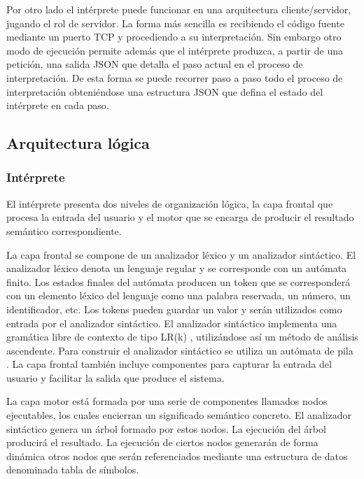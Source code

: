 Por otro lado el intérprete puede funcionar en una arquitectura cliente/servidor, jugando el rol de servidor. La forma más sencilla es recibiendo el código fuente 
mediante un puerto TCP y procediendo a su interpretación. Sin embargo otro modo de ejecución permite además que el intérprete produzca, a partir de una petición, una salida JSON que detalla el paso actual 
en el proceso de interpretación. De esta forma se puede recorrer paso a paso todo el proceso de interpretación obteniéndose una estructura JSON que defina el estado del intérprete en cada paso.

\subsection{Arquitectura lógica}
\subsubsection{Intérprete}
 El intérprete presenta dos niveles de organización lógica, la capa frontal que procesa la entrada del usuario y el motor que se encarga de producir el resultado semántico correspondiente. 
 
 La capa frontal se compone de un analizador léxico y un analizador sintáctico. El analizador léxico denota un lenguaje regular y se corresponde con un autómata finito. Los estados finales del autómata producen un 
 token que se corresponderá con un elemento léxico del lenguaje como una palabra reservada, un número, un identificador, etc. Los tokens pueden guardar un valor y serán utilizados como entrada por el analizador sintáctico.  
 El analizador sintáctico implementa una gramática libre de contexto de tipo LR(k) , utilizándose así un método de análisis ascendente.  Para construir el analizador sintáctico se utiliza un autómata de pila .  La capa frontal también 
 incluye componentes para capturar la entrada del usuario y facilitar la salida que produce el sistema.

La capa motor está formada por una serie de componentes llamados nodos ejecutables, los cuales encierran un significado semántico concreto. El analizador sintáctico genera un árbol formado por estos nodos. La 
ejecución del árbol producirá el resultado. La ejecución de ciertos nodos generarán de forma dinámica otros nodos que serán referenciados mediante una estructura de datos denominada tabla de símbolos. 

